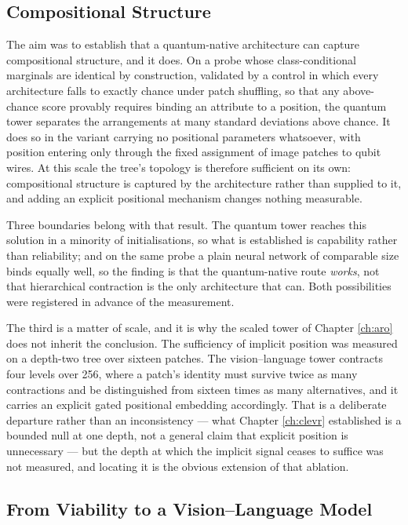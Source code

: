 \documentclass[12pt, a4paper, oneside]{report}
\begin{document}
\subsection{Compositional Structure}

The aim was to establish that a quantum-native architecture can capture
compositional structure, and it does. On a probe whose class-conditional
marginals are identical by construction, validated by a control in which
every architecture falls to exactly chance under patch shuffling, so that any
above-chance score provably requires binding an attribute to a position, the
quantum tower separates the arrangements at many standard deviations above
chance. It does so in the variant carrying no positional parameters whatsoever,
with position entering only through the fixed assignment of image patches to
qubit wires. At this scale the tree's topology is therefore sufficient on its
own: compositional structure is captured by the architecture rather than
supplied to it, and adding an explicit positional mechanism changes nothing
measurable.

Three boundaries belong with that result. The quantum tower reaches this
solution in a minority of initialisations, so what is established is capability
rather than reliability; and on the same probe a plain neural network of
comparable size binds equally well, so the finding is that the quantum-native
route \emph{works}, not that hierarchical contraction is the only architecture
that can. Both possibilities were registered in advance of the measurement.

The third is a matter of scale, and it is why the scaled tower of Chapter
\ref{ch:aro} does not inherit the conclusion. The sufficiency of implicit
position was measured on a depth-two tree over sixteen patches. The
vision--language tower contracts four levels over 256, where a patch's
identity must survive twice as many contractions and be distinguished from
sixteen times as many alternatives, and it carries an explicit gated positional
embedding accordingly. That is a deliberate departure rather than an
inconsistency --- what Chapter \ref{ch:clevr} established is a bounded null at
one depth, not a general claim that explicit position is unnecessary --- but
the depth at which the implicit signal ceases to suffice was not measured, and
locating it is the obvious extension of that ablation.

\subsection{From Viability to a Vision--Language Model}
\end{document}
